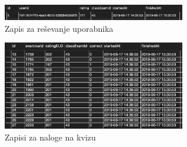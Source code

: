 \documentclass{IEEEtran}
\begin{document}
\lstset{basicstyle=\tiny,style=SQLstyle}
\begin{figure}[h!]
    \includegraphics[width=8cm]{PrimerTabeleUser}
    \caption{Zapis za reševanje uporabnika}%
    \label{fig:example}%
\end{figure}

\begin{figure}[h!]
    \includegraphics[width=8cm]{PrimerTabele}
    \caption{Zapisi za naloge na kvizu}%
    \label{fig:example}%
\end{figure}

\end{document}
